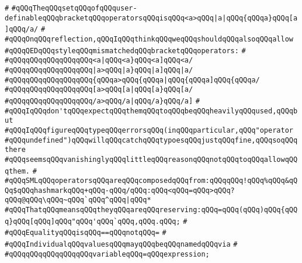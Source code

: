 \verb|#|\newline
\verb|#qQQqTheqQQqsetqQQqofqQQquser-definableqQQqbracketqQQqoperatorsqQQqisqQQq<a>qQQq|\verb#|a|qQQq{qQQqa}qQQq[a]qQQq/a/#\newline
\verb|#|\newline
\verb|#qQQqOnqQQqreflection,qQQqIqQQqthinkqQQqweqQQqshouldqQQqalsoqQQqallow|\newline
\verb|#qQQqQEDqQQqstyleqQQqmismatchedqQQqbracketqQQqoperators:|\newline
\verb|#|\newline
\verb|#qQQqqQQqqQQqqQQqqQQq<a|\verb#|qQQq<a}qQQq<a]qQQq<a/#\newline
\verb|#qQQqqQQqqQQqqQQqqQQq|\verb#|a>qQQq|a}qQQq|a]qQQq|a/#\newline
\verb|#qQQqqQQqqQQqqQQqqQQq{qQQqa>qQQq{qQQqa|\verb#|qQQq{qQQqa]qQQq{qQQqa/#\newline
\verb|#qQQqqQQqqQQqqQQqqQQq[a>qQQq[a|\verb#|qQQq[a}qQQq[a/#\newline
\verb|#qQQqqQQqqQQqqQQqqQQq/a>qQQq/a|\verb#|qQQq/a}qQQq/a]#\newline
\verb|#|\newline
\verb|#qQQqIqQQqdon'tqQQqexpectqQQqthemqQQqtoqQQqbeqQQqheavilyqQQqused,qQQqbut|\newline
\verb|#qQQqIqQQqfigureqQQqtypeqQQqerrorsqQQq(inqQQqparticular,qQQq"operator|\newline
\verb|#qQQqundefined")qQQqwillqQQqcatchqQQqtypoesqQQqjustqQQqfine,qQQqsoqQQqthere|\newline
\verb|#qQQqseemsqQQqvanishinglyqQQqlittleqQQqreasonqQQqnotqQQqtoqQQqallowqQQqthem.|\newline
\verb|#|\newline
\verb|#qQQqSMLqQQqoperatorsqQQqareqQQqcomposedqQQqfrom:qQQqqQQq!qQQq%qQQq&qQQq$qQQqhashmarkqQQq+qQQq-qQQq/qQQq:qQQq<qQQq=qQQq>qQQq?qQQq@qQQq\qQQq~qQQq`qQQq^qQQq|\verb#|qQQq*#\newline
\verb|#qQQqThatqQQqmeansqQQqtheyqQQqareqQQqreserving:qQQq=qQQq(qQQq)qQQq{qQQq}qQQq[qQQq]qQQq"qQQq'qQQq`qQQq,qQQq.qQQq;|\newline
\verb|#|\newline
\verb|#qQQqEqualityqQQqisqQQq==qQQqnotqQQq=|\newline
\verb|#|\newline
\verb|#qQQqIndividualqQQqvaluesqQQqmayqQQqbeqQQqnamedqQQqvia|\newline
\verb|#|\newline
\verb|#qQQqqQQqqQQqqQQqqQQqvariableqQQq=qQQqexpression;|\newline

